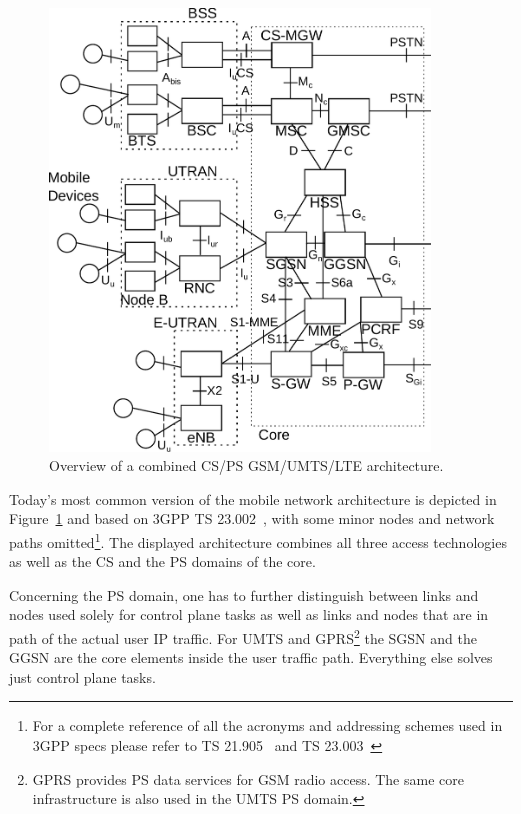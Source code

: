 \begin{figure}[htbp]
	\centering
	\includegraphics[width=0.9\textwidth]{images/3gpp-physical-arch.pdf}
	\caption{Overview of a combined \acrshort{CS}/\acrshort{PS} \acrshort{GSM}/\acrshort{UMTS}/\acrshort{LTE} architecture.}
\label{c4:fig:psdomain}
\end{figure}

Today's most common version of the mobile network architecture is depicted in Figure~\ref{c4:fig:psdomain} and based on \gls{3GPP} \gls{TS} 23.002~\cite{3gpp.23.002}, with some minor nodes and network paths omitted\footnote{For a complete reference of all the acronyms and addressing schemes used in \gls{3GPP} specs please refer to \gls{TS} 21.905~\cite{3gpp.21.905} and \gls{TS} 23.003~\cite{3gpp.23.003}}. The displayed architecture combines all three access technologies as well as the \gls{CS} and the \gls{PS} domains of the core. 

Concerning the \gls{PS} domain, one has to further distinguish between links and nodes used solely for control plane tasks as well as links and nodes that are in path of the actual user \gls{IP} traffic. For \gls{UMTS} and \gls{GPRS}\footnote{\gls{GPRS} provides \gls{PS} data services for \gls{GSM} radio access. The same core infrastructure is also used in the \gls{UMTS} \gls{PS} domain.} the \gls{SGSN} and the \gls{GGSN} are the core elements inside the user traffic path. Everything else solves just control plane tasks.

